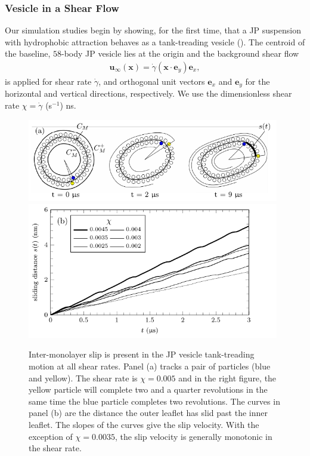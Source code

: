 \documentclass[lineno]{jfm}
\newcommand{\xx}{\mathbf{x}}
\newcommand{\uu}{\mathbf{u}}
\begin{document}
\subsubsection{Vesicle in a Shear Flow}
\label{sec:ves_in_shear}
Our simulation studies begin by showing, for the first time, that a JP
suspension with hydrophobic attraction behaves as a tank-treading
vesicle (\cite{Finken08, Shaqfeh11}). The centroid of the baseline,
$58$-body JP vesicle lies at the origin and the background shear flow 
\begin{align}
  \uu_{\infty}(\xx) = \dot\gamma (\xx \cdot \mathbf{e}_y) \mathbf{e}_x,
\end{align} 
is applied for shear rate $\dot\gamma$, and orthogonal unit vectors
$\mathbf{e}_x$ and $\mathbf{e}_y$ for the horizontal and vertical
directions, respectively. We use the dimensionless shear rate $\chi =
\dot \gamma$ (s$^{-1}$) ns.

\begin{figure}
\begin{center}
  \includegraphics[width=11cm]{Figure5_Wrapper.pdf}\\
  \includegraphics[width=11cm]{Figure5B_Wrapper.pdf}
\end{center} 
\caption{\label{figure5} Inter-monolayer slip is present in the JP
  vesicle tank-treading motion at all shear rates. Panel (a) tracks a
  pair of particles (blue and yellow). The shear rate is $\chi=0.005$
  and in the right figure, the yellow particle will complete two and a
  quarter revolutions in the same time the blue particle completes two
  revolutions. The curves in panel (b) are the distance the outer
  leaflet has slid past the inner leaflet. The slopes of the curves
  give the slip velocity. With the exception of $\chi = 0.0035$, the
  slip velocity is generally monotonic in the shear rate.}
\end{figure}
\end{document}
